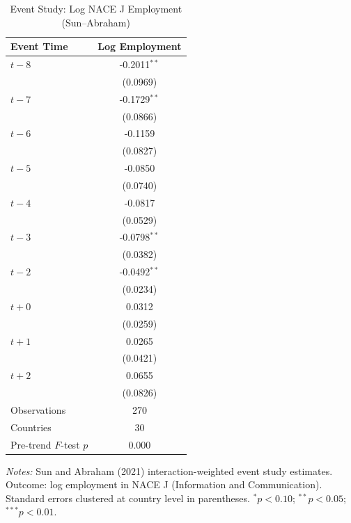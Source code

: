 \begin{table}[htbp]
\centering
\caption{Event Study: Log NACE J Employment (Sun--Abraham)}
\label{tab:event_study}
\begin{tabular}{lc}
\hline\hline
Event Time & Log Employment \\
\hline
$t -8$ & -0.2011$^{**}$ \\
 & (0.0969) \\
$t -7$ & -0.1729$^{**}$ \\
 & (0.0866) \\
$t -6$ & -0.1159 \\
 & (0.0827) \\
$t -5$ & -0.0850 \\
 & (0.0740) \\
$t -4$ & -0.0817 \\
 & (0.0529) \\
$t -3$ & -0.0798$^{**}$ \\
 & (0.0382) \\
$t -2$ & -0.0492$^{**}$ \\
 & (0.0234) \\
$t +0$ & 0.0312 \\
 & (0.0259) \\
$t +1$ & 0.0265 \\
 & (0.0421) \\
$t +2$ & 0.0655 \\
 & (0.0826) \\
\hline
Observations & 270 \\
Countries & 30 \\
Pre-trend $F$-test $p$ & 0.000 \\
\hline\hline
\end{tabular}
\begin{tablenotes}[flushleft]\small
\item \textit{Notes:} Sun and Abraham (2021) interaction-weighted event study estimates. Outcome: log employment in NACE J (Information and Communication). Standard errors clustered at country level in parentheses. $^{*}p<0.10$; $^{**}p<0.05$; $^{***}p<0.01$.
\end{tablenotes}
\end{table}

